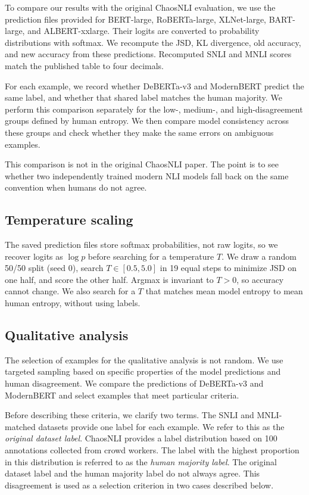 \documentclass[11pt,a4paper]{article}
\begin{document}
To compare our results with the original ChaosNLI evaluation, we use the prediction files provided for BERT-large, RoBERTa-large, XLNet-large, BART-large, and ALBERT-xxlarge. Their logits are converted to probability distributions with softmax. We recompute the JSD, KL divergence, old accuracy, and new accuracy from these predictions. Recomputed SNLI and MNLI scores match the published table to four decimals.

For each example, we record whether DeBERTa-v3 and ModernBERT predict the same label, and whether that shared label matches the human majority. We perform this comparison separately for the low-, medium-, and high-disagreement groups defined by human entropy. We then compare model consistency across these groups and check whether they make the same errors on ambiguous examples.

This comparison is not in the original ChaosNLI paper. The point is to see whether two independently trained modern NLI models fall back on the same convention when humans do not agree.

\subsection{Temperature scaling}

The saved prediction files store softmax probabilities, not raw logits, so we recover logits as $\log p$ before searching for a temperature $T$. We draw a random 50/50 split (seed 0), search $T \in [0.5, 5.0]$ in 19 equal steps to minimize JSD on one half, and score the other half. Argmax is invariant to $T>0$, so accuracy cannot change. We also search for a $T$ that matches mean model entropy to mean human entropy, without using labels.

\subsection{Qualitative analysis}

The selection of examples for the qualitative analysis is not random. We use targeted sampling based on specific properties of the model predictions and human disagreement. We compare the predictions of DeBERTa-v3 and ModernBERT and select examples that meet particular criteria.

Before describing these criteria, we clarify two terms. The SNLI and MNLI-matched datasets provide one label for each example. We refer to this as the \textit{original dataset label}. ChaosNLI provides a label distribution based on 100 annotations collected from crowd workers. The label with the highest proportion in this distribution is referred to as the \textit{human majority label}. The original dataset label and the human majority label do not always agree. This disagreement is used as a selection criterion in two cases described below.
\end{document}
